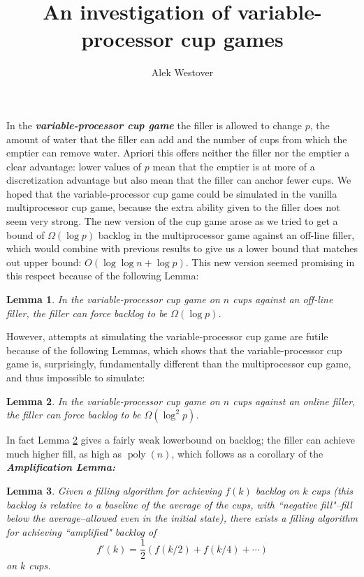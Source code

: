\documentclass{article}[11pt]
\title{An investigation of variable-processor cup games}
\author{Alek Westover}
\newcommand{\defn}[1]{{\textit{\textbf{\boldmath #1}}}}
\DeclareMathOperator{\poly}{\text{poly}}
\newtheorem{lemma}{Lemma}
\begin{document}
\maketitle

In the \defn{variable-processor cup game} the filler is allowed to change
$p$, the amount of water that the filler can add and the number of cups from
which the emptier can remove water.  Apriori this offers neither the filler nor the emptier a clear
advantage: lower values of $p$ mean that the emptier is at more of a
discretization advantage but also mean that the filler can anchor fewer cups.
We hoped that the variable-processor cup game could be simulated in the vanilla
multiprocessor cup game, because the extra ability given to the filler does not
seem very strong. The new version of the cup game arose as we tried to get a bound 
of $\Omega(\log p)$ backlog in the multiprocessor game against an off-line filler, 
which would combine with previous results to give us a lower bound that matches
out upper bound: $O(\log\log n + \log p)$. This new version seemed promising in
this respect because of the following Lemma:

\begin{lemma}
  \label{lem:dprand}
  In the variable-processor cup game on $n$ cups against an 
  off-line filler, the filler can force backlog to be $\Omega(\log p)$.
\end{lemma}

However, attempts at simulating the variable-processor cup game are futile
because of the following Lemmas, which shows that the variable-processor cup
game is, surprisingly, fundamentally different than the multiprocessor cup game,
and thus impossible to simulate:

\begin{lemma}
  \label{lem:dpdet}
  In the variable-processor cup game on $n$ cups against an online filler, the
  filler can force backlog to be $\Omega(\log^2 p)$.
\end{lemma}

In fact Lemma \ref{lem:dpdet} gives a fairly weak lowerbound on backlog; the
filler can achieve much higher fill, as high as $\poly(n)$, which follows as a
corollary of the \defn{Amplification Lemma:}

\begin{lemma}
  \label{lem:amplification}
  Given a filling algorithm for achieving $f(k)$ backlog on $k$ cups (this
  backlog is relative to a baseline of the average of the cups, with ``negative
  fill"--fill below the average--allowed even in the initial state), there
  exists a filling algorithm for achieving ``amplified" backlog of
  $$f'(k) = \frac{1}{2}(f(k/2) + f(k/4) + \cdots )$$
  on $k$ cups.
\end{lemma}
\end{document}
